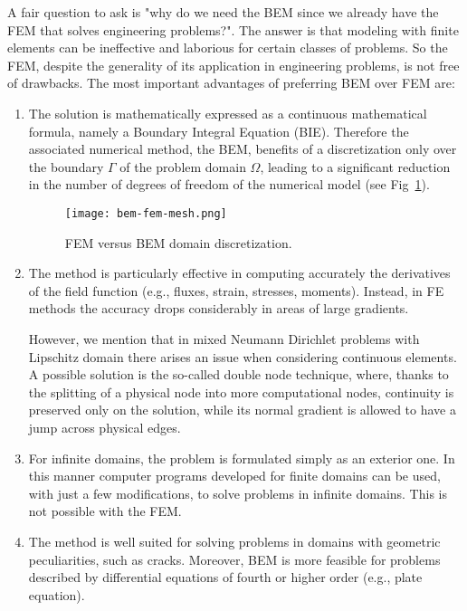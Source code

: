 A fair question to ask is "why do we need the BEM since we already have the FEM that solves engineering problems?". The answer is that modeling with finite elements can be ineffective and laborious for certain classes of problems. So the FEM, despite the generality of its application in engineering problems, is not free of drawbacks. The most important advantages of preferring BEM over FEM are:
\begin{enumerate}
  \item The solution is mathematically expressed as a continuous mathematical formula, namely a Boundary Integral Equation (BIE). Therefore the associated numerical method, the BEM, benefits of a discretization only over the boundary $\Gamma$ of the problem domain $\Omega$, leading to a significant reduction in the number of degrees of freedom of the numerical model (see Fig~\ref{fig:bem-fem-mesh}).
  \begin{figure}[H]
    \centering
    \texttt{[image: bem-fem-mesh.png]}
    \caption{FEM versus BEM domain discretization.}
    \label{fig:bem-fem-mesh}
  \end{figure}
  \item The method is particularly effective in computing accurately the derivatives of the field function (e.g., fluxes, strain, stresses, moments).  Instead, in FE methods the accuracy drops considerably in areas of large gradients.

  However, we mention that in mixed Neumann Dirichlet problems with Lipschitz domain there arises an issue when considering continuous elements. A possible solution is the so-called double node technique, where, thanks to the splitting of a physical node into more computational nodes, continuity is preserved only on the solution, while its normal gradient is allowed to have a jump across physical edges.
  
  \item For infinite domains, the problem is formulated simply as an exterior one. In this manner computer programs developed for finite domains can be used, with just a few modifications, to solve problems in infinite domains. This is not possible with the FEM.
  \item The method is well suited for solving problems in domains with geometric peculiarities, such as cracks. Moreover, BEM is more feasible for problems described by differential equations of fourth or higher order (e.g., plate equation).
\end{enumerate}

